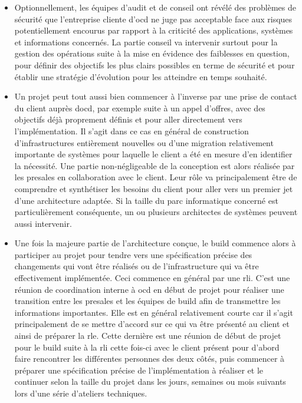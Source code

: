 \documentclass[12pt, oneside, a4paper, titlepage]{report}
\begin{document}
\begin{itemize}

    \item Optionnellement, les équipes d'audit et de conseil ont révélé des
        problèmes de sécurité que l'entreprise cliente d'\gls{ocd} ne juge pas
        acceptable face aux risques potentiellement encourus par rapport à la
        criticité des applications, systèmes et informations concernés. La
        partie conseil va intervenir surtout pour la gestion des opérations
        suite à la mise en évidence des faiblesses en question, pour définir des
        objectifs les plus clairs possibles en terme de sécurité et pour établir
        une stratégie d'évolution pour les atteindre en temps souhaité.

    \item Un projet peut tout aussi bien commencer à l'inverse par une prise de
        contact du client auprès d\gls{ocd}, par exemple suite à un appel
        d'offres, avec des objectifs déjà proprement définis et pour aller
        directement vers l'implémentation. Il s'agit dans ce cas en général de
        construction d'infrastructures entièrement nouvelles ou d'une migration
        relativement importante de systèmes pour laquelle le client a été en
        mesure d'en identifier la nécessité. Une partie non-négligeable de la
        conception est alors réalisée par les \gls{presales} en collaboration
        avec le client.  Leur rôle va principalement être de comprendre et
        synthétiser les besoins du client pour aller vers un premier jet d'une
        architecture adaptée. Si la taille du parc informatique concerné est
        particulièrement conséquente, un ou plusieurs architectes de systèmes
        peuvent aussi intervenir.

    \item Une fois la majeure partie de l'architecture conçue, le \gls{build}
        commence alors à participer au projet pour tendre vers une spécification
        précise des changements qui vont être réalisés ou de l'infrastructure
        qui va être effectivement implémentée. Ceci commence en général par une
        \gls{rli}. C'est une réunion de coordination interne à \gls{ocd} en
        début de projet pour réaliser une transition entre les \gls{presales} et
        les équipes de \gls{build} afin de transmettre les informations
        importantes. Elle est en général relativement courte car il s'agit
        principalement de se mettre d'accord sur ce qui va être présenté au
        client et ainsi de préparer la \gls{rle}. Cette dernière est une réunion
        de début de projet pour le \gls{build} suite à la \gls{rli} cette
        fois-ci avec le client présent pour d'abord faire rencontrer les
        différentes personnes des deux côtés, puis commencer à préparer une
        spécification précise de l'implémentation à réaliser et le continuer
        selon la taille du projet dans les jours, semaines ou mois suivants lors
        d'une série d'ateliers techniques.


\end{itemize}
\end{document}
